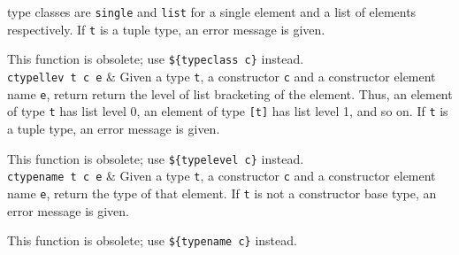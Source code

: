 \begin{desctab}
type classes are {\tt single} and {\tt list} for a single element and
a list of elements respectively.  If {\tt t} is a tuple type, an error
message is given.
\par
This function is obsolete; use \verb'${typeclass c}' instead.
\\
{\tt ctypellev t c e}
&
Given a type {\tt t}, a constructor {\tt c} and a constructor element name
{\tt e}, return return the level of list bracketing of the element. Thus,
an element of type \verb't' has list level 0, an element of type
\verb'[t]' has list level 1, and so on.  If {\tt t} is a tuple type,
an error message is given.
\par
This function is obsolete; use \verb'${typelevel c}' instead.
\\
{\tt ctypename t c e}
&
Given a type {\tt t},
a constructor {\tt c}
and a constructor element name {\tt e},
return the type of that element.
If {\tt t} is not a constructor base type, an error message is given.
\par
This function is obsolete; use \verb'${typename c}' instead.
\\
\end{desctab}
